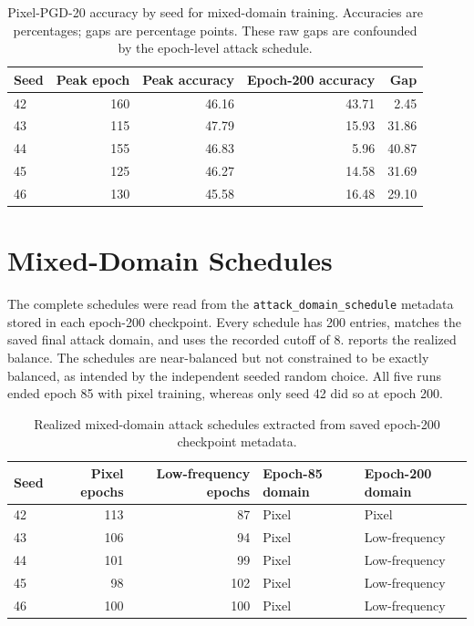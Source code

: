 \documentclass[11pt]{article}
\begin{document}
\begin{table}[!htbp]
\centering
\caption{Pixel-PGD-20 accuracy by seed for mixed-domain training.
Accuracies are percentages; gaps are percentage points. These raw gaps
are confounded by the epoch-level attack schedule.}
\label{tab:per-seed-mixed}
\begin{tabular*}{\linewidth}{@{\extracolsep{\fill}}lrrrr@{}}
\toprule
Seed & Peak epoch & Peak accuracy & Epoch-200 accuracy & Gap \\
\midrule
42 & 160 & 46.16 & 43.71 & 2.45 \\
43 & 115 & 47.79 & 15.93 & 31.86 \\
44 & 155 & 46.83 & 5.96 & 40.87 \\
45 & 125 & 46.27 & 14.58 & 31.69 \\
46 & 130 & 45.58 & 16.48 & 29.10 \\
\bottomrule
\end{tabular*}
\end{table}

\FloatBarrier
{}
\section{Mixed-Domain Schedules}
\label{app:schedules}
The complete schedules were read from the \texttt{attack\_domain\_schedule}
metadata stored in each epoch-200 checkpoint. Every schedule has 200 entries,
matches the saved final attack domain, and uses the recorded cutoff of $8$.
 reports the realized balance. The schedules are
near-balanced but not constrained to be exactly balanced, as intended by the
independent seeded random choice. All five runs ended epoch 85 with pixel
training, whereas only seed 42 did so at epoch 200.

\begin{table}[!htbp]
\centering
\caption{Realized mixed-domain attack schedules extracted from saved
epoch-200 checkpoint metadata.}
\label{tab:mixed-schedules}
\begin{tabular*}{\linewidth}{@{\extracolsep{\fill}}lrrll@{}}
\toprule
Seed & Pixel epochs & Low-frequency epochs & Epoch-85 domain & Epoch-200 domain \\
\midrule
42 & 113 & 87 & Pixel & Pixel \\
43 & 106 & 94 & Pixel & Low-frequency \\
44 & 101 & 99 & Pixel & Low-frequency \\
45 & 98 & 102 & Pixel & Low-frequency \\
46 & 100 & 100 & Pixel & Low-frequency \\
\bottomrule
\end{tabular*}
\end{table}
\end{document}
